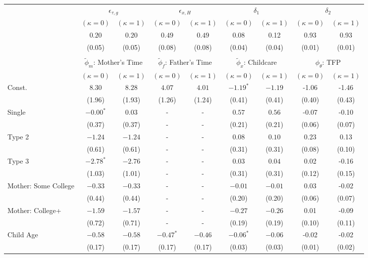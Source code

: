 \begin{tabular}{lcccccccc}\\\toprule
 & \multicolumn{2}{c}{$\epsilon_{\tau,g}$} & \multicolumn{2}{c}{$\epsilon_{x,H}$} & \multicolumn{2}{c}{$\delta_{1}$} & \multicolumn{2}{c}{$\delta_{2}$} \\
& $(\kappa=0)$ & $(\kappa=1)$ & $(\kappa=0)$ & $(\kappa=1)$ & $(\kappa=0)$ & $(\kappa=1)$ & $(\kappa=0)$ & $(\kappa=1)$ \\\cmidrule(r){2-3}\cmidrule(r){4-5}\cmidrule(r){6-7}\cmidrule(r){8-9}
&$0.20$&$0.20$&$0.49$&$0.49$&0.08&0.12&0.93&0.93\\
&(0.05)&(0.05)&(0.08)&(0.08)&(0.04)&(0.04)&(0.01)&(0.01)\\
&&&&&&&&\\
 & \multicolumn{2}{c}{$\tilde{\phi}_{m}$: Mother's Time} & \multicolumn{2}{c}{$\tilde{\phi}_{f}$: Father's Time} & \multicolumn{2}{c}{$\tilde{\phi}_{x}$: Childcare} & \multicolumn{2}{c}{$\phi_{\theta}$: TFP} \\
& $(\kappa=0)$ & $(\kappa=1)$ & $(\kappa=0)$ & $(\kappa=1)$ & $(\kappa=0)$ & $(\kappa=1)$ & $(\kappa=0)$ & $(\kappa=1)$ \\\cmidrule(r){2-3}\cmidrule(r){4-5}\cmidrule(r){6-7}\cmidrule(r){8-9}
Const.&$8.30$&$8.28$&$4.07$&$4.01$&$-1.19^{*}$&$-1.19$&-1.06&-1.46\\
&(1.96)&(1.93)&(1.26)&(1.24)&(0.41)&(0.41)&(0.40)&(0.43)\\
Single&$-0.00^{*}$&$0.03$&-&-&$0.57$&$0.56$&-0.07&-0.10\\
&(0.37)&(0.37)&-&-&(0.21)&(0.21)&(0.06)&(0.07)\\
Type 2&$-1.24$&$-1.24$&-&-&$0.08$&$0.10$&0.23&0.13\\
&(0.61)&(0.61)&-&-&(0.31)&(0.31)&(0.08)&(0.10)\\
Type 3&$-2.78^{*}$&$-2.76$&-&-&$0.03$&$0.04$&0.02&-0.16\\
&(1.03)&(1.01)&-&-&(0.31)&(0.31)&(0.12)&(0.15)\\
Mother: Some College&$-0.33$&$-0.33$&-&-&$-0.01$&$-0.01$&0.03&-0.02\\
&(0.44)&(0.44)&-&-&(0.20)&(0.20)&(0.06)&(0.07)\\
Mother: College+&$-1.59$&$-1.57$&-&-&$-0.27$&$-0.26$&0.01&-0.09\\
&(0.72)&(0.71)&-&-&(0.19)&(0.19)&(0.10)&(0.11)\\
Child Age&$-0.58$&$-0.58$&$-0.47^{*}$&$-0.46$&$-0.06^{*}$&$-0.06$&-0.02&-0.02\\
&(0.17)&(0.17)&(0.17)&(0.17)&(0.03)&(0.03)&(0.01)&(0.02)\\

\end{tabular}
